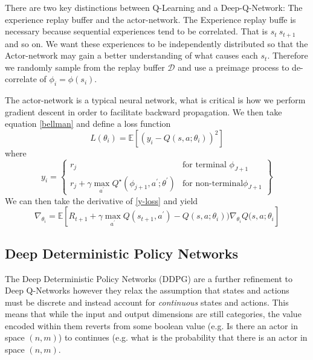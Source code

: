 \documentclass[man, 12pt]{apa6}
\begin{document}
There are two key distinctions between Q-Learning and a Deep-Q-Network: The experience replay buffer and the actor-network. The Experience replay buffe is necessary because sequential experiences tend to be correlated. That is $s_{t} ~ s_{t+1}$ and so on.  We want these experiences to be independently distributed so that the Actor-network may gain a better understanding of what causes each $s_{t}$. Therefore we randomly sample from the replay buffer $\mathcal{D}$ and use a preimage process to de-correlate of $\phi_{i} = \phi(s_{i})$. 

The actor-network is a typical neural network, what is critical is how we perform gradient descent in order to facilitate backward propagation. We then take equation \ref{bellman} and define a loss function \begin{equation}
\label{loss-dqn}
L(\theta_{i}) = \mathbb{E}  \left[ (y_{i} -Q(s,a;\theta_{i}))^{2} \right]
\end{equation} 
where \begin{equation} \label{y-loss}
y_{i} = 
		\left\{\begin{array}{lr}
		 r_{j}  & \text{for terminal }  \phi_{J+1} \\
		r_{j} + \gamma  \max_{a ^{\prime}} Q^{\star} (\phi_{j+1}, a^{\prime}; \theta^{\prime})  &  \text{for non-terminal}  \phi_{J+1} 
		\end{array} \right\}
\end{equation}
We can then take the derivative of \ref{y-loss} and yield \begin{equation}
\label{loss-actor}
\nabla_{\theta_{i}} = \mathbb{E} \left[R_{t+1} + \gamma \max_{a^{\prime}} Q(s_{t+1},a^{\prime})-Q(s,  a; \theta_{i}))\nabla_{\theta_{i}}Q(s,a; \theta_{i} \right] 
\end{equation}

\FloatBarrier
\subsection{Deep Deterministic Policy Networks}
The Deep Deterministic Policy Networks (DDPG) are a further refinement to Deep Q-Networks however they relax the assumption that states and actions must be discrete and instead account for \emph{continuous} states and actions. This means that while the input and output dimensions are still categories, the value encoded within them reverts from some boolean value (e.g. Is there an actor in space $(n,m)$) to continues (e.g. what is the probability that there is an actor in space $(n,m)$. 
\end{document}
